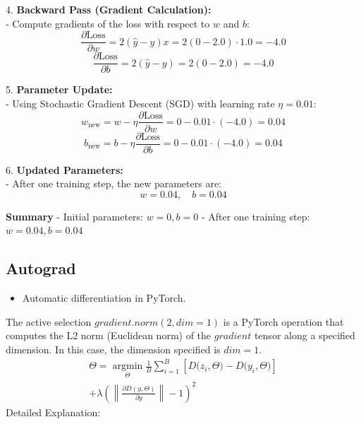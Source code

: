 \documentclass{article}
\begin{document}
4. \textbf{Backward Pass (Gradient Calculation):} \\
   - Compute gradients of the loss with respect to \( w \) and \( b \): \\
     \[
     \frac{\partial \text{Loss}}{\partial w} = 2(\hat{y} - y)x = 2(0 - 2.0) \cdot 1.0 = -4.0 
     \]
     \[
     \frac{\partial \text{Loss}}{\partial b} = 2(\hat{y} - y) = 2(0 - 2.0) = -4.0
     \]

5. \textbf{Parameter Update:}\\
   - Using Stochastic Gradient Descent (SGD) with learning rate \( \eta = 0.01 \): \\
     \[
     w_{\text{new}} = w - \eta \frac{\partial \text{Loss}}{\partial w} = 0 - 0.01 \cdot (-4.0) = 0.04
     \]
     \[
     b_{\text{new}} = b - \eta \frac{\partial \text{Loss}}{\partial b} = 0 - 0.01 \cdot (-4.0) = 0.04
     \]

6. \textbf{Updated Parameters:}\\
   - After one training step, the new parameters are:\\
     \[
     w = 0.04, \quad b = 0.04
     \]

\textbf{Summary}
- Initial parameters: \( w = 0, b = 0 \)
- After one training step: \( w = 0.04, b = 0.04 \)
\subsection{Autograd}
\begin{itemize}
    \item Automatic differentiation in PyTorch.
\end{itemize}
The active selection $gradient.norm(2, dim=1)$ is a PyTorch operation that computes the L2 norm (Euclidean norm) of the $gradient$ tensor along a specified dimension. 
In this case, the dimension specified is $dim=1$.
$$\begin{array}{c}{{\Theta=\!\operatorname*{argmin}_{\Theta}\frac1B\sum_{i=1}^{B}\left[D\Big(z_{i},\Theta\Big)-D\Big(y_{i},\Theta\Big)\right]}}\\ {{+\lambda\!\left(\left\|\frac{\partial D(y,\Theta)}{\partial y}\right\|-1\right)^{2}}}\end{array}$$
Detailed Explanation:\\
\end{document}
